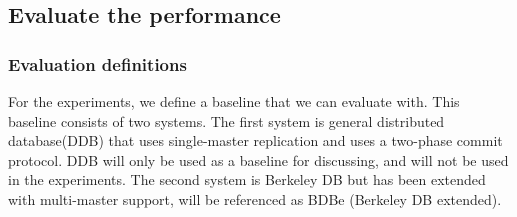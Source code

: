 


\subsection{Evaluate the performance} 
\label{subsec:experiment}


\subsubsection{Evaluation definitions} %
\label{ssub:evaluation_baseline}

For the experiments, we define a baseline that we can evaluate with. This baseline consists of two systems. The first system is general distributed database(DDB) that uses single-master replication and uses a two-phase commit protocol. DDB will only be used as a baseline for discussing, and will not be used in the experiments. The second system is Berkeley DB but has been extended with multi-master support, will be referenced as BDBe (Berkeley DB extended). 

